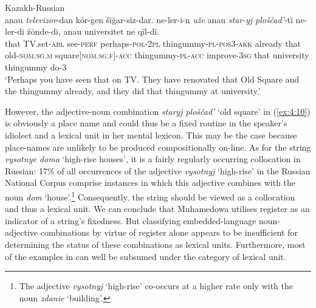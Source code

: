 \ea{\label{ex:4:10}}
Kazakh-Russian \citep[82]{muhamedowa-untersuchung-2006}\\
\gll anau \textit{televizor}-dan kör-gen šïğar-sïz-dar. ne-ler-i-n \textit{uže} anau \textit{star-yj} \textit{ploščad'}-tï ne-ler-di žönde-di, anau universitet ne qïl-dï.\\
	that {TV.set}-\textsc{abl} see-\textsc{perf} perhaps-\textsc{pol-2pl} thingummy-\textsc{pl-pos3-akk} already that old-\textsc{nom.sg.m} square[\textsc{nom.sg.f}]-\textsc{acc} thingummy-\textsc{pl-acc} improve-\textsc{3sg} that university thingummy do-\textsc{3}\\
\glt `Perhaps you have seen that on TV. They have renovated that Old Square and the thingummy already, and they did that thingummy at university.'
\z

\noindent However, the adjective-noun combination \textit{staryj ploščad'} `old square' in (\ref{ex:4:10}) is obviously a place name and could thus be a fixed routine in the speaker's idiolect and a lexical unit in her mental lexicon. This may be the case because place-names are unlikely to be produced compositionally on-line. As for the string \textit{vysotnye doma} `high-rise houses', it is a fairly regularly occurring collocation in Russian: 17\% of all occurrences of the adjective \textit{vysotnyj} `high-rise' in the Russian National Corpus comprise instances in which this adjective combines with the noun \textit{dom} `house'.\footnote{The adjective \textit{vysotnyj} `high-rise' co-occurs at a higher rate only with the noun \textit{zdanie} `building'.} Consequently, the string should be viewed as a  collocation and thus a lexical unit. We can conclude that Muhamedowa utilises register as an indicator of a string's fixedness. But classifying embedded-language noun-adjective combinations by virtue of register alone appears to be insufficient for determining the status of these combinations as lexical units. Furthermore, most of the examples in \citet[81--88]{muhamedowa-untersuchung-2006} can well be subsumed under the category of lexical unit. 

